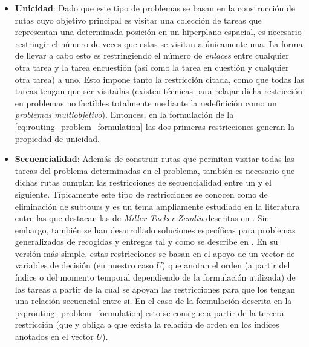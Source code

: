 \documentclass{subfiles}
\begin{document}
        \begin{itemize}

          \item \textbf{Unicidad}: Dado que este tipo de problemas se basan en la construcción de rutas cuyo objetivo principal es visitar una colección de tareas que representan una determinada posición en un hiperplano espacial, es necesario restringir el número de veces que estas se visitan a únicamente una. La forma de llevar a cabo esto es restringiendo el número de \emph{enlaces} entre cualquier otra tarea y la tarea encuestión (así como la tarea en cuestión y cualquier otra tarea) a uno. Esto impone tanto la restricción citada, como que todas las tareas tengan que ser visitadas (existen técnicas para relajar dicha restricción en problemas no factibles totalmente mediante la redefinición como un \emph{problemas multiobjetivo}). Entonces, en la formulación de la \cref{eq:routing_problem_formulation} las dos primeras restricciones generan la propiedad de unicidad.

          \item \textbf{Secuencialidad}: Además de construir rutas que permitan visitar todas las tareas del problema determinadas en el problema, también es necesario que dichas rutas cumplan las restricciones de secuencialidad entre un  y el siguiente. Típicamente este tipo de restricciones se conocen como de eliminación de subtours y es un tema ampliamente estudiado en la literatura entre las que destacan las de \emph{Miller-Tucker-Zemlin} descritas en \cite{miller1960integer}. Sin embargo, también se han desarrollado soluciones específicas para problemas generalizados de recogidas y entregas tal y como se describe en \cite{desrochers1991improvements}. En su versión más simple, estas restricciones se basan en el apoyo de un vector de variables de decisión (en nuestro caso $U$) que anotan el orden (a partir del índice o del momento temporal dependiendo de la formulación utilizada) de las tareas a partir de la cual se apoyan las restricciones para que los  tengan una relación secuencial entre si. En el caso de la formulación descrita en la \cref{eq:routing_problem_formulation} esto se consigue a partir de la tercera restricción (que  y obliga a que exista la relación de orden en los índices anotados en el vector $U$).

        \end{itemize}
\end{document}
